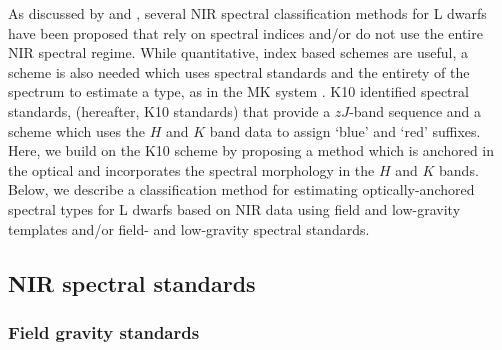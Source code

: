 \documentclass[12pt,preprint]{aastex}
\begin{document}
As discussed by \citet[\S~3.2]{Kirkpatrick05} and \citet[hereafter K10]{Kirkpatrick10}, several NIR spectral classification methods for L dwarfs have been proposed that rely on spectral indices and/or do not use the entire NIR spectral regime.
While quantitative, index based schemes are useful, a scheme is also needed which uses spectral standards and the entirety of the spectrum to estimate a type, as in the MK system \citep{Morgan:1984wy}.
K10 identified spectral standards, (hereafter, K10 standards) that provide a $zJ$-band sequence and a scheme which uses the $H$ and $K$ band data to assign `blue' and `red' suffixes. 
Here, we build on the K10 scheme by proposing a method which is anchored in the optical and incorporates the spectral morphology in the $H$ and $K$ bands.
Below, we describe a classification method for estimating optically-anchored spectral types for L dwarfs based on NIR data using field and low-gravity templates and/or field- and low-gravity spectral standards.



\subsection{NIR spectral standards}
\subsubsection{Field gravity standards}
\label{sec:field_stds}
\end{document}
